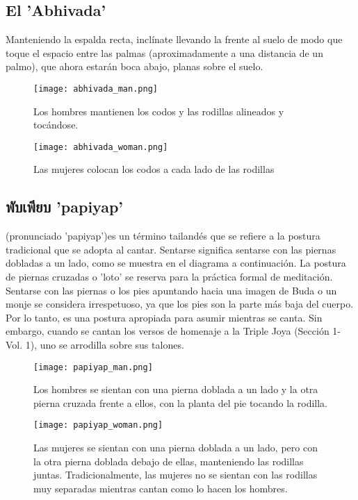 \subsection{El 'Abhivada'}
Manteniendo la espalda recta, inclínate llevando la frente al suelo de modo que toque el espacio entre las palmas (aproximadamente a una distancia de un palmo), que ahora estarán boca abajo, planas sobre el suelo.
\begin{figure}[h]
	\centering
	\begin{minipage}{0.40\textwidth}
		\centering
		\texttt{[image: abhivada\_man.png]}
		\caption{Los hombres mantienen los codos y las rodillas alineados y tocándose.}
	\end{minipage}
	\hfill
	\begin{minipage}{0.40\textwidth}
		\centering
		\texttt{[image: abhivada\_woman.png]}
		\caption{Las mujeres colocan los codos a cada lado de las rodillas}
	\end{minipage}
\end{figure}

\subsection{\thaiFont พับเพียบ 'papiyap'}

 \normalfont(pronunciado 'papiyap')es un término tailandés que se refiere a la postura tradicional que se adopta al cantar. Sentarse  \normalfont significa sentarse con las piernas dobladas a un lado, como se muestra en el diagrama a continuación. La postura de piernas cruzadas o 'loto' se reserva para la práctica formal de meditación. Sentarse con las piernas o los pies apuntando hacia una imagen de Buda o un monje se considera irrespetuoso, ya que los pies son la parte más baja del cuerpo. Por lo tanto,  \normalfont es una postura apropiada para asumir mientras se canta. Sin embargo, cuando se cantan los versos de homenaje a la Triple Joya (Sección 1-Vol. 1), uno se arrodilla sobre sus talones. 
\enlargethispage{3\baselineskip}
\begin{figure}[h]
	\centering
	
	\begin{minipage}{0.49\textwidth}
		\centering
		\texttt{[image: papiyap\_man.png]}
		\caption{Los hombres se sientan con una pierna doblada a un lado y la otra pierna cruzada frente a ellos, con la planta del pie tocando la rodilla.}
	\end{minipage}
	\hfill
	\begin{minipage}{0.49\textwidth}
		\centering
		\texttt{[image: papiyap\_woman.png]}
		\caption{Las mujeres se sientan con una pierna doblada a un lado, pero con la otra pierna doblada debajo de ellas, manteniendo las rodillas juntas. Tradicionalmente, las mujeres no se sientan con las rodillas muy separadas mientras cantan como lo hacen los hombres.}
	\end{minipage}
	
\end{figure}

